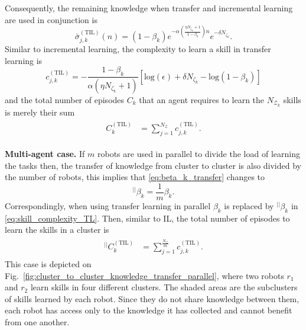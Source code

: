 Consequently, the remaining knowledge when transfer and incremental learning are used in conjunction is
\begin{equation}\label{eq:remaining_knowledge__ITL}
	\bar{\sigma}^{(\text{TIL})}_{j,k}(n) = \left(1- \beta_k\right) e^{-\alpha  \left(\frac{ \eta N_{\zeta_k}+1}{1 - \beta_k}\right) n} e^{-\delta N_{\zeta_k}}.
\end{equation}
Similar to incremental learning, the complexity to learn a skill in transfer learning is
\begin{equation}\label{eq:skill_complexity_TL}
	c^{(\text{TIL})}_{j,k} = -\frac{1 - \beta_{k}}{\alpha (\eta N_{\zeta_k}+ 1)}\left[\text{log}(\epsilon) + \delta N_{\zeta_k} - \text{log}(1 - \beta_{k})\right]
\end{equation}
and the total number of episodes  $ C_k $ that an agent requires to learn the $N_{\mathcal{Z}_k}$ skills is merely their sum
\begin{align}\label{eq:total_episodes_transfer}
	\begin{split}
		C^{(\text{TIL})}_k &= \sum^{N_{\mathcal{Z}}}_{j=1} c^{(\text{TIL})}_{j,k}.
	\end{split}
\end{align}

\textbf{Multi-agent case.} If $m$ robots are used in parallel to divide the load of learning the tasks then, the transfer of knowledge from cluster to cluster is also divided by the number of robots, this implies that \eqref{eq:beta_k_transfer} changes to
\begin{equation}\label{eq:beta_k_transfer_parallel}
	{}^{\lvert \rvert}\beta_{k}= \frac{1}{m}\beta_{k}.
\end{equation}
Correspondingly, when using transfer learning in parallel $\beta_k$ is replaced by ${}^{\lvert \rvert}\beta_{k}$ in \eqref{eq:skill_complexity_TL}. Then, similar to IL, the total number of episodes to learn the skills in a cluster is
\begin{align}
	\begin{split}
		{}^{\lvert \rvert}C^{(\text{TIL})}_k &= \sum^{\frac{N_{\mathcal{Z}}}{m}}_{j=1} c^{(\text{TIL})}_{j,k}.
	\end{split}
\end{align}
This case is depicted on Fig.~\ref{fig:cluster_to_cluster_knowledge_transfer_parallel}, where two robots $ r_1$ and $r_2$ learn skills in four different clusters. The shaded areas are the subclusters of skills learned by each robot. Since they do not share knowledge between them, each robot has access only to the knowledge it has collected and cannot benefit from one another. 

